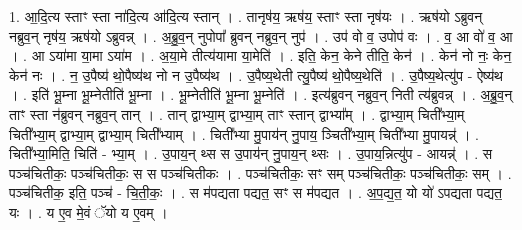 \documentclass[17pt]{extarticle}
\begin{document}
1. आ॒दि॒त्य स्ताꣳ स्ता ना॑दि॒त्य आ॑दि॒त्य स्तान् । . तानृष॑य॒ ऋष॑य॒ स्ताꣳ स्ता नृष॑यः । . ऋष॑यो ऽब्रुवन् नब्रुव॒न् नृष॑य॒ ऋष॑यो ऽब्रुवन्न् । . अ॒ब्रु॒व॒न् नुपोपा᳚ ब्रुवन् नब्रुव॒न् नुप॑ । . उप॑ वो व॒ उपोप॑ वः । . व॒ आ वो॑ व॒ आ । . आ ऽया॑मा या॒मा ऽया॑म । . अ॒या॒मे तीत्य॑यामा या॒मेति॑ । . इति॒ केन॒ केने तीति॒ केन॑ । . केन॑ नो नः॒ केन॒ केन॑ नः । . न॒ उ॒पैष्य॑ थो॒पैष्य॑थ नो न उ॒पैष्य॑थ । . उ॒पैष्य॒थेती त्यु॒पैष्य॑ थो॒पैष्य॒थेति॑ । . उ॒पैष्य॒थेत्यु॑प - ऐष्य॑थ । . इति॑ भू॒म्ना भू॒म्नेतीति॑ भू॒म्ना । . भू॒म्नेतीति॑ भू॒म्ना भू॒म्नेति॑ । . इत्य॑ब्रुवन् नब्रुव॒न् निती त्य॑ब्रुवन्न् । . अ॒ब्रु॒व॒न् ताꣳ स्ता न॑ब्रुवन् नब्रुव॒न् तान् । . तान् द्वाभ्या॒म् द्वाभ्या॒म् ताꣳ स्तान् द्वाभ्या᳚म् । . द्वाभ्या॒म् चिती᳚भ्या॒म् चिती᳚भ्या॒म् द्वाभ्या॒म् द्वाभ्या॒म् चिती᳚भ्याम् । . चिती᳚भ्या मु॒पाय॑न् नु॒पाय॒ ञ्चिती᳚भ्या॒म् चिती᳚भ्या मु॒पायन्न्॑ । . चिती᳚भ्या॒मिति॒ चिति॑ - भ्या॒म् । . उ॒पाय॒न् थ्स स उ॒पाय॑न् नु॒पाय॒न् थ्सः । . उ॒पाय॒न्नित्यु॑प - आयन्न्॑ । . स पञ्च॑चितीकः॒ पञ्च॑चितीकः॒ स स पञ्च॑चितीकः । . पञ्च॑चितीकः॒ सꣳ सम् पञ्च॑चितीकः॒ पञ्च॑चितीकः॒ सम् । . पञ्च॑चितीक॒ इति॒ पञ्च॑ - चि॒ती॒कः॒ । . स म॑पद्यता पद्यत॒ सꣳ स म॑पद्यत । . अ॒प॒द्य॒त॒ यो यो॑ ऽपद्यता पद्यत॒ यः । . य ए॒व मे॒वं ॅयो य ए॒वम् । \newline
\end{document}
